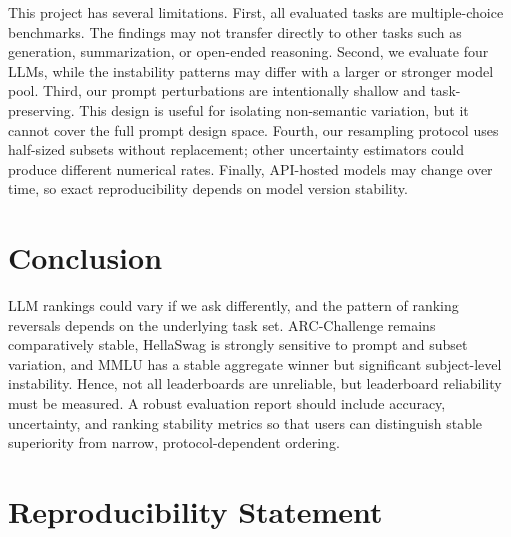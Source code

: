 \documentclass[11pt]{article}
\theoremstyle{definition}
\begin{document}
This project has several limitations. First, all evaluated tasks are multiple-choice benchmarks. The findings may not transfer directly to other tasks such as generation, summarization, or open-ended reasoning. Second, we evaluate four LLMs, while the instability patterns may differ with a larger or stronger model pool. Third, our prompt perturbations are intentionally shallow and task-preserving. This design is useful for isolating non-semantic variation, but it cannot cover the full prompt design space. Fourth, our resampling protocol uses half-sized subsets without replacement; other uncertainty estimators could produce different numerical rates. Finally, API-hosted models may change over time, so exact reproducibility depends on model version stability.

\section{Conclusion}

LLM rankings could vary if we ask differently, and the pattern of ranking reversals depends on the underlying task set. ARC-Challenge remains comparatively stable, HellaSwag is strongly sensitive to prompt and subset variation, and MMLU has a stable aggregate winner but significant subject-level instability. Hence, not all leaderboards are unreliable, but leaderboard reliability must be measured. A robust evaluation report should include accuracy, uncertainty, and ranking stability metrics so that users can distinguish stable superiority from narrow, protocol-dependent ordering.

\section*{Reproducibility Statement}
\end{document}
